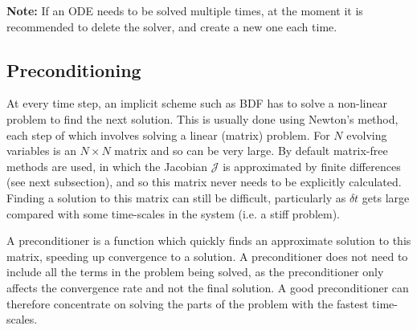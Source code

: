 \documentclass[12pt]{article}
\begin{document}
{\bf Note: } If an ODE needs to be solved multiple times, at the moment
it is recommended to delete the solver, and create a new one each time.

\subsection{Preconditioning}

At every time step, an implicit scheme such as BDF has to solve a non-linear
problem to find the next
solution. This is usually done using Newton's method, each step of which involves solving a linear (matrix)
problem. For $N$ evolving variables is an $N\times N$ matrix and so can be very large.
By default matrix-free methods are used, in which the
Jacobian $\mathcal{J}$ is approximated by finite differences (see next subsection), and so this matrix
never needs to be explicitly calculated. Finding a solution to this matrix can still be difficult, particularly
as $\delta t$ gets large compared with some time-scales in the system (i.e. a
stiff problem).

A preconditioner is a function which quickly finds an approximate solution to this matrix, speeding up
convergence to a solution. A preconditioner does not need to include all the terms in the problem being
solved, as the preconditioner only affects the convergence rate and not the final solution. A good preconditioner
can therefore concentrate on solving the parts of the problem with the fastest
time-scales.
\end{document}
